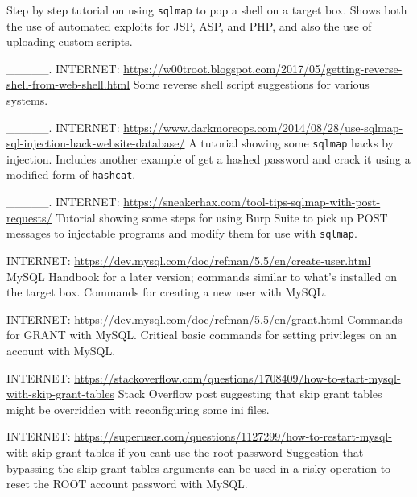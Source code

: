 Step by step tutorial on using \texttt{sqlmap} to pop a shell on a target box.  Shows both the use of automated exploits for JSP, ASP, and PHP, and also the use of uploading custom scripts.  

\endnote{[10]} \_\_\_\_\_.  INTERNET:  \url{https://w00troot.blogspot.com/2017/05/getting-reverse-shell-from-web-shell.html}
Some reverse shell script suggestions for various systems.  

\endnote{[11]} \_\_\_\_\_.  INTERNET:  \url{https://www.darkmoreops.com/2014/08/28/use-sqlmap-sql-injection-hack-website-database/}
A tutorial showing some \texttt{sqlmap} hacks by injection.  Includes another example of get a hashed password and crack it using a modified form of \texttt{hashcat}.

\endnote{[12]} \_\_\_\_\_.  INTERNET:  \url{https://sneakerhax.com/tool-tips-sqlmap-with-post-requests/}
Tutorial showing some steps for using Burp Suite to pick up POST messages to injectable programs and modify them for use with \texttt{sqlmap}.

\endnote{[13]}  INTERNET:  \url{https://dev.mysql.com/doc/refman/5.5/en/create-user.html}
MySQL Handbook for a later version; commands similar to what's installed on the target box.  Commands for creating a new user with MySQL.

\endnote{[14]}  INTERNET:  \url{https://dev.mysql.com/doc/refman/5.5/en/grant.html}
Commands for GRANT with MySQL.  Critical basic commands for setting privileges on an account with MySQL.

\endnote{[15]}  INTERNET:  \url{https://stackoverflow.com/questions/1708409/how-to-start-mysql-with-skip-grant-tables}
Stack Overflow post suggesting that skip grant tables might be overridden with reconfiguring some ini files.

\endnote{[16]}  INTERNET:  \url{https://superuser.com/questions/1127299/how-to-restart-mysql-with-skip-grant-tables-if-you-cant-use-the-root-password}
Suggestion that bypassing the skip grant tables arguments can be used in a risky operation to reset the ROOT account \gls{password} with MySQL.

